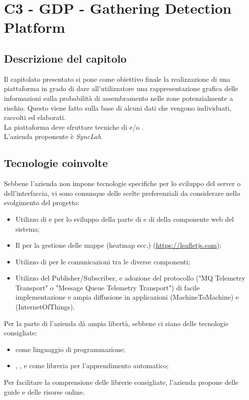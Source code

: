 \section{C3 - GDP - Gathering Detection Platform}

\subsection{Descrizione del capitolo}
Il capitolato presentato si pone come obiettivo finale la realizzazione di una piattaforma in grado di dare all'utilizzatore una rappresentazione grafica delle informazioni sulla probabilità di assembramento nelle zone potenzialmente a rischio. Questo viene fatto sulla base di alcuni dati che vengono individuati, raccolti ed elaborati. \\
La piattaforma deve sfruttare tecniche di  e/o .\\
L'azienda proponente è \textit{SyncLab}.

\subsection{Tecnologie coinvolte}
Sebbene l'azienda non impone tecnologie specifiche per lo sviluppo del server o dell'interfaccia, vi sono comunque delle scelte preferenziali da considerare nello svolgimento del progetto:
\begin{itemize}
\item Utilizzo di  e  per lo sviluppo della parte di  e di  della componente web del sistema;
\item Il   per la gestione delle mappe (heatmap ecc.) (\url{https://leafletjs.com});
\item Utilizzo di  per le comunicazioni tra le diverse componenti;
\item Utilizzo del  Publisher/Subscriber, e adozione del protocollo  ("MQ Telemetry Transport" o "Message Queue Telemetry Transport") di facile implementazione e ampia diffusione in applicazioni  (MachineToMachine) e  (InternetOfThings).
\end{itemize}
Per la parte di  l'azienda dà ampia libertà, sebbene ci siano delle tecnologie consigliate:
\begin{itemize}
\item {} come linguaggio di programmazione;
\item {}, ,  e  come libreria per l'apprendimento automatico;
\end{itemize}
Per facilitare la comprensione delle librerie consigliate, l'azienda propone delle guide e delle risorse online.

